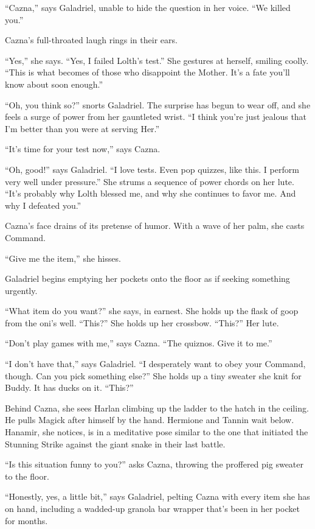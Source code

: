 \documentclass[smalldemyvopaper,11pt,twoside,onecolumn,openright,extrafontsizes]{memoir}
\begin{document}
``Cazna,'' says Galadriel, unable to hide the question in her voice.
``We killed you.''

Cazna's full-throated laugh rings in their ears.

``Yes,'' she says. ``Yes, I failed Lolth's test.'' She gestures at
herself, smiling coolly. ``This is what becomes of those who disappoint
the Mother. It's a fate you'll know about soon enough.''

``Oh, you think so?'' snorts Galadriel. The surprise has begun to wear
off, and she feels a surge of power from her gauntleted wrist. ``I think
you're just jealous that I'm better than you were at serving Her.''

``It's time for your test now,'' says Cazna.

``Oh, good!'' says Galadriel. ``I love tests. Even pop quizzes, like
this. I perform very well under pressure.'' She strums a sequence of
power chords on her lute. ``It's probably why Lolth blessed me, and why
she continues to favor me. And why I defeated you.''

Cazna's face drains of its pretense of humor. With a wave of her palm,
she casts Command.

``Give me the item,'' she hisses.

Galadriel begins emptying her pockets onto the floor as if seeking
something urgently.

``What item do you want?'' she says, in earnest. She holds up the flask
of goop from the oni's well. ``This?'' She holds up her crossbow.
``This?'' Her lute.

``Don't play games with me,'' says Cazna. ``The quiznos. Give it to
me.''

``I don't have that,'' says Galadriel. ``I desperately want to obey your
Command, though. Can you pick something else?'' She holds up a tiny
sweater she knit for Buddy. It has ducks on it. ``This?''

Behind Cazna, she sees Harlan climbing up the ladder to the hatch in the
ceiling. He pulls Magick after himself by the hand. Hermione and Tannin
wait below. Hanamir, she notices, is in a meditative pose similar to the
one that initiated the Stunning Strike against the giant snake in their
last battle.

``Is this situation funny to you?'' asks Cazna, throwing the proffered
pig sweater to the floor.

``Honestly, yes, a little bit,'' says Galadriel, pelting Cazna with
every item she has on hand, including a wadded-up granola bar wrapper
that's been in her pocket for months.
\end{document}
